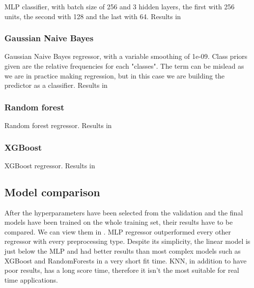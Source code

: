 MLP classifier, with batch size of 256 and 3 hidden layers, the first with 256 units, the second with 128 and the last with 64. Results in 



\subsubsection{Gaussian Naive Bayes}

Gaussian Naive Bayes regressor, with a variable smoothing of 1e-09. Class priors given are the relative frequencies for each "classes". The term can be mislead as we are in practice making regression, but in this case we are building the predictor as a classifier.
Results in 




\subsubsection{Random forest}

Random forest regressor.
Results in 




\subsubsection{XGBoost}

XGBoost regressor.
Results in 



\subsection{Model comparison}

After the hyperparameters have been selected from the validation and the final models have been trained on the whole training set, their results have to be compared. We can view them in .
MLP regressor outperformed every other regressor with every preprocessing type. Despite its simplicity, the linear model is just below the MLP and had better results than most complex models such as XGBoost and RandomForests in a very short fit time. KNN, in addition to have poor results, has a long score time, therefore it isn't the most suitable for real time applications.

